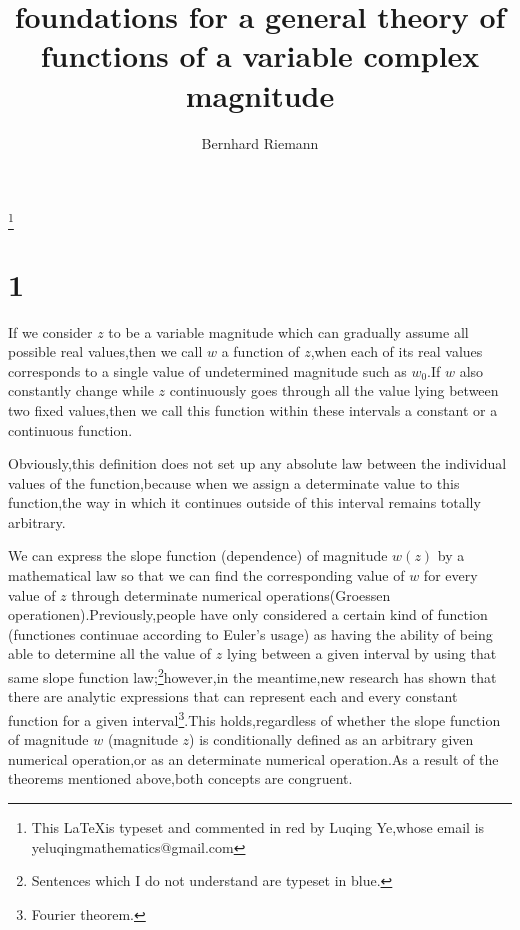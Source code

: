 \documentclass{amsart}
\theoremstyle{plain}
\theoremstyle{definition}
\begin{document}
\title{foundations for a general theory of functions of a variable
  complex magnitude}

\author{Bernhard Riemann}
 \thanks{This \LaTeX is typeset and commented in red by
   Luqing Ye,whose email is yeluqingmathematics@gmail.com}


\maketitle

\setcounter{tocdepth}{2}

\section*{1}
\label{sec:1}


If we consider $z$ to be a variable magnitude which can gradually
assume all possible real values,then we call $w$ a function of
$z$,when each of its real values corresponds to a single value of
undetermined magnitude such as $w_0$.If $w$ also constantly change
while $z$ continuously goes through all the value lying between two
fixed values,then we call this function within these intervals a
constant or a continuous function.


Obviously,this definition does not set up any absolute law between the
individual values of the function,because when we assign a determinate
value to this function,the way in which it continues outside of this
interval remains totally arbitrary.

We can express the slope function (dependence) of magnitude $w(z)$ by
a mathematical law so that we can find the corresponding value of $w$
for every value of $z$ through determinate numerical
operations(Groessen operationen).{\color{blue}Previously,people have
  only considered a certain kind of function (functiones continuae
  according to Euler's usage) as having the ability of being able to
  determine all the value of $z$ lying between a given interval by
  using that same slope function law;}\footnote{{\color{red}
    Sentences which I do not understand are typeset in
    blue.}}however,in the meantime,new research has shown that there
are analytic expressions that can represent each and every constant
function for a given interval\footnote{{\color{red} Fourier
    theorem.}}.This holds,regardless of whether the slope function of
magnitude $w$ (magnitude $z$) is conditionally defined as an arbitrary
given numerical operation,or as an determinate numerical operation.As
a result of the theorems mentioned above,both concepts are congruent.
\end{document}

